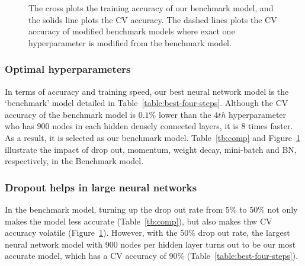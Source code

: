 \begin{figure}
    \caption{The cross plots the training accuracy of our benchmark model, and the  solids line plots the CV accuracy. The dashed lines plots the CV accuracy of modified benchmark models where exact one hyperparameter is modified from the benchmark model.}
    \label{fig:acc-iter}
\end{figure}
\subsubsection{Optimal hyperparameters}
In terms of accuracy and training speed, our best neural network model is the `benchmark' model detailed in Table~\ref{table:best-four-steps}. Although the CV accuracy of the benchmark model is $0.1\%$ lower than the $4th$ hyperparameter who has $900$ nodes in each hidden densely connected layers, it is $8$ times faster. As a result, it is selected as our benchmark model. Table~\ref{tb:comp} and Figure~\ref{fig:acc-iter} illustrate the impact of drop out, momentum, weight decay, mini-batch and BN, respectively, in the Benchmark model.

\subsubsection{Dropout helps in large neural networks}
In the benchmark model, turning up the drop out rate from $5\%$ to $50\%$ not only makes the model less accurate (Table~\ref{tb:comp}), but also makes thw CV accuracy volatile (Figure~\ref{fig:acc-iter}). However, with the $50\%$ drop out rate, the largest neural network model with $900$ nodes per hidden layer turns out to be our most accurate model, which has a CV accuracy of $90\%$ (Table~\ref{table:best-four-steps}). 

